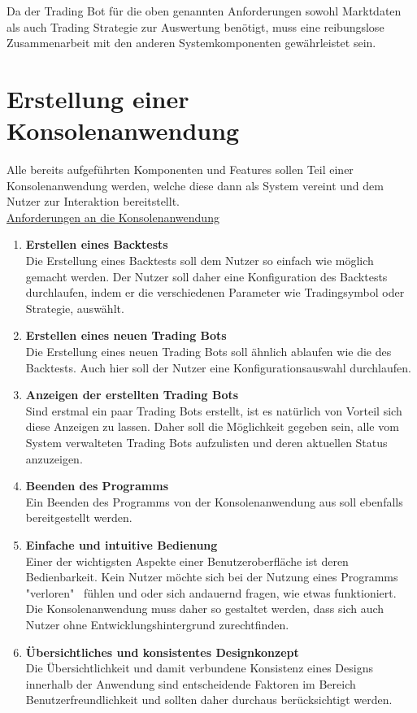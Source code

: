 \documentclass[oneside]{ausarbeitung}
\begin{document}
Da der Trading Bot für die oben genannten Anforderungen sowohl
Marktdaten als auch Trading Strategie zur Auswertung benötigt, muss
eine reibungslose Zusammenarbeit mit den anderen Systemkomponenten
gewährleistet sein.


\section{Erstellung einer Konsolenanwendung}
\label{sec:erstellung_cli}

Alle bereits aufgeführten Komponenten und Features sollen Teil einer
Konsolenanwendung werden, welche diese dann als System vereint und dem
Nutzer zur Interaktion bereitstellt. \\

\underline{Anforderungen an die Konsolenanwendung}
\begin{enumerate}
	\item \textbf{Erstellen eines Backtests} \\
		Die Erstellung eines Backtests soll dem Nutzer so einfach wie möglich
		gemacht werden. Der Nutzer soll daher eine Konfiguration des Backtests
		durchlaufen, indem er die verschiedenen Parameter wie Tradingsymbol oder 
		Strategie, auswählt.
	\item \textbf{Erstellen eines neuen Trading Bots} \\
		Die Erstellung eines neuen Trading Bots soll ähnlich ablaufen wie die des
		Backtests. Auch hier soll der Nutzer eine Konfigurationsauswahl
		durchlaufen.
	\item \textbf{Anzeigen der erstellten Trading Bots} \\
		Sind erstmal ein paar Trading Bots erstellt, ist es natürlich von Vorteil
		sich diese Anzeigen zu lassen. Daher soll die Möglichkeit gegeben sein,
		alle vom System verwalteten Trading Bots aufzulisten und deren aktuellen
		Status anzuzeigen.
	\item \textbf{Beenden des Programms} \\
		Ein Beenden des Programms von der Konsolenanwendung aus soll ebenfalls
		bereitgestellt werden.
	\item \textbf{Einfache und intuitive Bedienung} \\
		Einer der wichtigsten Aspekte einer Benutzeroberfläche ist deren
		Bedienbarkeit. Kein Nutzer möchte sich bei der Nutzung eines Programms
		"verloren" \ fühlen und oder sich andauernd fragen, wie etwas 
		funktioniert. Die
		Konsolenanwendung muss daher so gestaltet werden, dass sich auch Nutzer
		ohne Entwicklungshintergrund zurechtfinden.
	\item \textbf{Übersichtliches und konsistentes Designkonzept} \\
		Die Übersichtlichkeit und damit verbundene Konsistenz eines Designs 
		innerhalb der Anwendung sind entscheidende Faktoren im Bereich 
		Benutzerfreundlichkeit und sollten daher durchaus berücksichtigt werden.
\end{enumerate}
\end{document}
